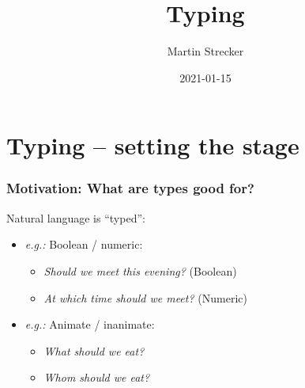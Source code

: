 \documentclass{beamer}
\title{Typing}
\author{Martin Strecker}
\date{2021-01-15}
\begin{document}

\begin{frame}
  \titlepage
\end{frame}



\section{Typing -- setting the stage}

\begin{frame}[fragile]\frametitle{Motivation: What are types good for?}

   Natural language is ``typed'':
  \begin{itemize}
  \item \emph{e.g.:} Boolean / numeric:
    \begin{itemize}
    \item \emph{Should we meet this evening?} (Boolean)
    \item \emph{At which time should we meet?} (Numeric)
    \end{itemize}
  \item \emph{e.g.:} Animate / inanimate:
    \begin{itemize}
    \item \emph{What should we eat?}
    \item \emph{Whom should we eat?}
    \end{itemize}
  \end{itemize}
  
\end{frame}
\end{document}
